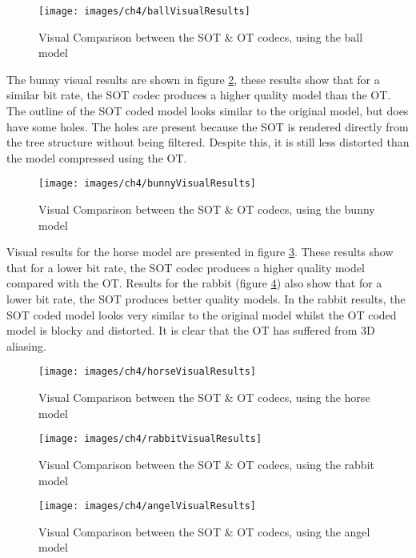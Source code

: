 \begin{figure}[!h]
\centering
\texttt{[image: images/ch4/ballVisualResults]}
\caption{Visual Comparison between the SOT \& OT codecs, using the ball model}
\label{ballVisualResults}
\end{figure}

The bunny visual results are shown in figure \ref{bunnyVisualResults}, these results show that for a similar bit rate, the SOT codec produces a higher quality model than the OT. The outline of the SOT coded model looks similar to the original model, but does have some holes. The holes are present because the SOT is rendered directly from the tree structure without being filtered. Despite this, it is still less distorted than the model compressed using the OT. 

\begin{figure}[!h]
\centering
\texttt{[image: images/ch4/bunnyVisualResults]}
\caption{Visual Comparison between the SOT \& OT codecs, using the bunny model}
\label{bunnyVisualResults}
\end{figure}

Visual results for the horse model are presented in figure \ref{horseVisualResults}. These results show that for a lower bit rate, the SOT codec produces a higher quality model compared with the OT. Results for the rabbit (figure \ref{rabbitVisualResults}) also show that for a lower bit rate, the SOT produces better quality models. In the rabbit results, the SOT coded model looks very similar to the original model whilst the OT coded model is blocky and distorted. It is clear that the OT has suffered from 3D aliasing. 

\begin{figure}[!h]
\centering
\texttt{[image: images/ch4/horseVisualResults]}
\caption{Visual Comparison between the SOT \& OT codecs, using the horse model}
\label{horseVisualResults}
\end{figure}

\begin{figure}[!h]
\centering
\texttt{[image: images/ch4/rabbitVisualResults]}
\caption{Visual Comparison between the SOT \& OT codecs, using the rabbit model}
\label{rabbitVisualResults}
\end{figure}

\begin{figure}[!h]
\centering
\texttt{[image: images/ch4/angelVisualResults]}
\caption{Visual Comparison between the SOT \& OT codecs, using the angel model}
\label{angelVisualResults}
\end{figure}

